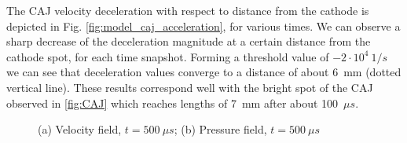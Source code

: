 \documentclass[a4paper]{iacas}%
\begin{document}
The CAJ velocity deceleration with respect to distance from the cathode is depicted in Fig. \ref{fig:model_caj_acceleration}, for various times. We can observe a sharp decrease of the deceleration magnitude at a certain distance from the cathode spot, for each time snapshot. Forming a threshold value of $-2\cdot 10^4~1/s$ we can see that deceleration values converge to a distance of about 6~mm (dotted vertical line). These results correspond well with the bright spot of the CAJ observed in \ref{fig:CAJ} which reaches lengths of 7~mm after about 100~$\mu s$. 

\begin{figure}
	\centering
	
	
	\caption{(a) Velocity field, $ t = 500~\mu s $; (b) Pressure field, $ t = 500~\mu s $}
\end{figure}
\end{document}
